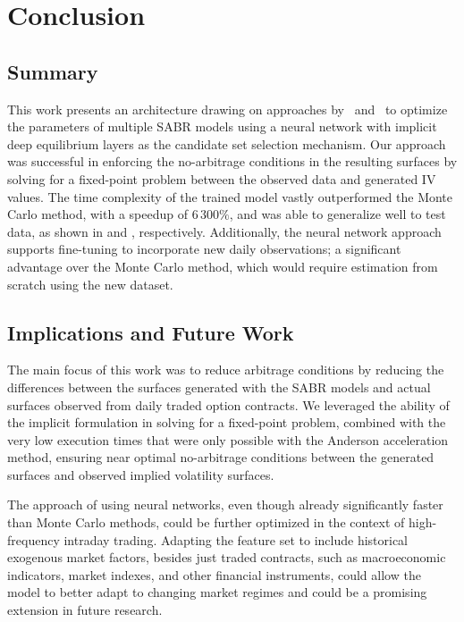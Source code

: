 \section{Conclusion}
\label{sec:conclusion}

\subsection{Summary}
\label{subsec:summary}
This work presents an architecture drawing on approaches by~\cite{Kim2021} and~\cite{Kolter2020}
to optimize the parameters of multiple SABR models using a neural network with implicit deep equilibrium layers as the candidate set selection mechanism.
Our approach was successful in enforcing the no-arbitrage conditions in the resulting surfaces by solving for a fixed-point problem between the observed data and generated IV values.
The time complexity of the trained model vastly outperformed the Monte Carlo method, with a speedup of $6\,300\%$, and was able to generalize well to test data,
as shown in  and , respectively.
Additionally, the neural network approach supports fine-tuning to incorporate new daily observations;
a significant advantage over the Monte Carlo method, which would require estimation from scratch using the new dataset.

\subsection{Implications and Future Work}
\label{subsec:implications}
The main focus of this work was to reduce arbitrage conditions by reducing the differences between the surfaces
generated with the SABR models and actual surfaces observed from daily traded option contracts.
We leveraged the ability of the implicit formulation in solving for a fixed-point problem,
combined with the very low execution times that were only possible with the Anderson acceleration method,
ensuring near optimal no-arbitrage conditions between the generated surfaces and observed implied volatility surfaces.

The approach of using neural networks, even though already significantly faster than Monte Carlo methods,
could be further optimized in the context of high-frequency intraday trading.
Adapting the feature set to include historical exogenous market factors, besides just traded contracts,
such as macroeconomic indicators, market indexes, and other financial instruments,
could allow the model to better adapt to changing market regimes and could be a promising extension in future research.
